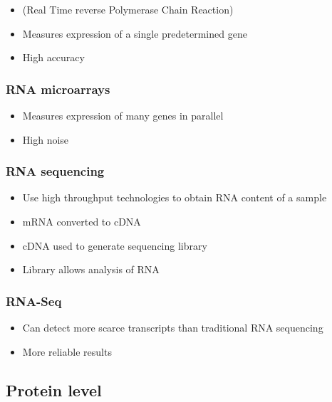\documentclass[a4paper]{article}
\begin{document}
\begin{itemize}
  \item
    (Real Time reverse Polymerase Chain Reaction)

  \item
    Measures expression of a single predetermined gene

  \item
    High accuracy
\end{itemize}

\subsubsection{RNA microarrays}

\begin{itemize}
  \item
    Measures expression of many genes in parallel

  \item
    High noise
\end{itemize}

\subsubsection{RNA sequencing}

\begin{itemize}
  \item
    Use high throughput technologies to obtain RNA content of a sample

  \item
    mRNA converted to cDNA

  \item
    cDNA used to generate sequencing library

  \item
    Library allows analysis of RNA
\end{itemize}

\subsubsection{RNA-Seq}

\begin{itemize}
  \item
    Can detect more scarce transcripts than traditional RNA sequencing

  \item
    More reliable results
\end{itemize}

\subsection{Protein level}
\end{document}

